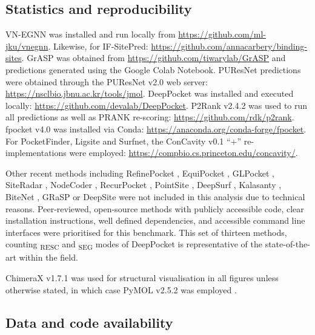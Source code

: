 \vspace{-12pt} %
\vspace{-12pt} %

\subsection{Statistics and reproducibility}

VN-EGNN was installed and run locally from \url{https://github.com/ml-jku/vnegnn}. Likewise, for IF-SitePred: \url{https://github.com/annacarbery/binding-sites}. GrASP was obtained from \url{https://github.com/tiwarylab/GrASP} and predictions generated using the Google Colab Notebook. PUResNet predictions were obtained through the PUResNet v2.0 web server: \url{https://nsclbio.jbnu.ac.kr/tools/jmol}. DeepPocket was installed and executed locally: \url{https://github.com/devalab/DeepPocket}. P2Rank v2.4.2 was used to run all predictions as well as PRANK re-scoring: \url{https://github.com/rdk/p2rank}. fpocket v4.0 was installed via Conda: \url{https://anaconda.org/conda-forge/fpocket}. For PocketFinder, Ligsite and Surfnet, the ConCavity v0.1 ``+'' re-implementations were employed: \url{https://compbio.cs.princeton.edu/concavity/}.

Other recent methods including RefinePocket \cite{LIU_2023_REFINEPOCKET}, EquiPocket \cite{ZHANG_2024_EQUIPOCKET}, GLPocket \cite{LI_2023_GLPOCKET}, SiteRadar \cite{EVTEEV_2023_SITERADAR}, NodeCoder \cite{ABDOLLAHI_2023_NODECODER}, RecurPocket \cite{LI_2022_RECURPOCKET}, PointSite \cite{YAN_2022_POINTSITE}, DeepSurf \cite{MYOLNAS_2021_DEEPSURF}, Kalasanty \cite{STEPNIEWSKA_2020_KALASANTY}, BiteNet \cite{KOZLOVSKII_2020_BITENET}, GRaSP \cite{SANTANA_2020_GRaSP} or DeepSite \cite{JIMENEZ_2017_DEEPSITE} were not included in this analysis due to technical reasons. Peer-reviewed, open-source methods with publicly accessible code, clear installation instructions, well defined dependencies, and accessible command line interfaces were prioritised for this benchmark. This set of thirteen methods, counting \textsubscript{RESC} and \textsubscript{SEG} modes of DeepPocket is representative of the state-of-the-art within the field.

ChimeraX v1.7.1 \cite{PETTERSEN_2021_CHIMERAX} was used for structural visualisation in all figures unless otherwise stated, in which case PyMOL v2.5.2 was employed \cite{SCHRODINGER_2015_PYMOL}.

\subsection{Data and code availability}

